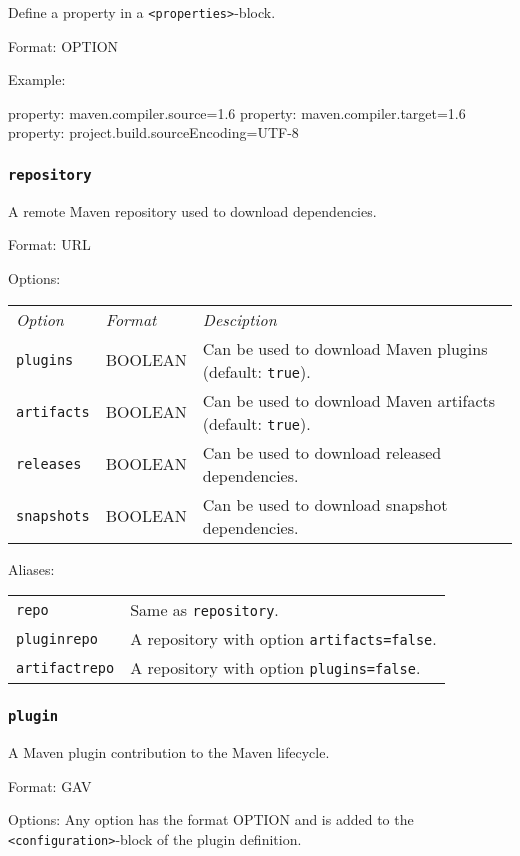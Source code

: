 \documentclass[a4paper,12pt,english,oneside,halfparskip]{scrartcl}
\newcommand{\code}[1]{\texttt{#1}}
\begin{document}
Define a property in a \code{<properties>}-block.

Format: OPTION

Example:
\begin{Cmdline}
property: maven.compiler.source=1.6
property: maven.compiler.target=1.6
property: project.build.sourceEncoding=UTF-8
\end{Cmdline}



\subsubsection{\code{repository}}

A remote Maven repository used to download dependencies.

Format: URL

Options:

\begin{tabular}{llp{}}
\emph{Option} & \emph{Format} & \emph{Desciption} \\
\code{plugins} &  BOOLEAN & Can be used to download Maven plugins (default: \code{true}). \\
\code{artifacts} &  BOOLEAN & Can be used to download Maven artifacts (default: \code{true}). \\
\code{releases} &  BOOLEAN & Can be used to download released dependencies. \\
\code{snapshots} &  BOOLEAN & Can be used to download snapshot dependencies. \\
\end{tabular}

Aliases:

\begin{tabular}{ll}
\code{repo} &  Same as \code{repository}. \\
\code{pluginrepo} & A repository with option \code{artifacts=false}. \\
\code{artifactrepo} &  A repository with option \code{plugins=false}. \\
\end{tabular}


\subsubsection{\code{plugin}}

A Maven plugin contribution to the Maven lifecycle.

Format: GAV

Options: Any option has the format OPTION and is added to the \code{<configuration>}-block of the plugin definition.
\end{document}
